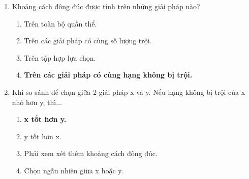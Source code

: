 \documentclass{book}
\begin{document}
\begin{enumerate}
    \item Khoảng cách đông đúc được tính trên những giải pháp nào?
    \begin{multicols}{2}
        \begin{enumerate}[label=\Alph*]
            \item Trên toàn bộ quần thể.
            \item Trên các giải pháp có cùng số lượng trội.
            \item Trên tập hợp lựa chọn.
            \item \textbf{Trên các giải pháp có cùng hạng không bị trội.}
        \end{enumerate}
    \end{multicols}

    \item Khi so sánh để chọn giữa 2 giải pháp x và y. Nếu hạng không bị trội của x nhỏ hơn y, thì...
    \begin{multicols}{2}
        \begin{enumerate}[label=\Alph*]
            \item \textbf{x tốt hơn y.}
            \item y tốt hơn x.
            \item Phải xem xét thêm khoảng cách đông đúc.
            \item Chọn ngẫu nhiên giữa x hoặc y.
        \end{enumerate}
    \end{multicols}


\end{enumerate}
\end{document}
